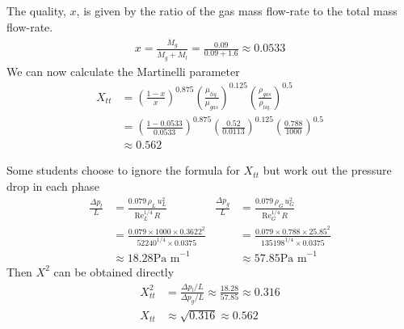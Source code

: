 \documentclass[calculator,datasheet,handbook]{exam}
\begin{document}
\begin{question}
\begin{enumerate}[a)]
\begin{enumerate}[i)]
{        The quality, $x$, is given by the ratio of the gas mass
        flow-rate to the total mass flow-rate.
        \begin{align*}
          x = \frac{\dot{M}_g}{\dot{M}_g+\dot{M}_l} = \frac{0.09}{0.09+1.6} \approx 0.0533
        \end{align*}
        We can now calculate the Martinelli parameter
        \begin{align*}
          X_{tt}&=\left(\frac{1-x}{x}\right)^{0.875}
          \left(\frac{\mu_{liq.}}{\mu_{gas}}\right)^{0.125}
          \left(\frac{\rho_{gas}}{\rho_{liq.}}\right)^{0.5}\\
          &=\left(\frac{1-0.0533}{0.0533}\right)^{0.875}
          \left(\frac{0.52}{0.0113}\right)^{0.125}
          \left(\frac{0.788}{1000}\right)^{0.5}\\
          &\approx 0.562
        \end{align*}

        
        Some students choose to ignore the formula for
        $X_{tt}$ but work out the pressure drop in each phase
        \begin{align*}
          \frac{\Delta p_l}{L} &= \frac{0.079 \,\rho_L \,u_L^2 }{\textrm{Re}_L^{1/4}\,R} & \frac{\Delta p_g}{L} &= \frac{0.079 \,\rho_G \,u_G^2 }{\textrm{Re}_G^{1/4}\,R}\\
          &= \frac{0.079\times 1000\times 0.3622^2}{52240^{1/4}\times0.0375} &
          &= \frac{0.079\times 0.788\times 25.85^2}{135198^{1/4}\times0.0375}\\
          &\approx 18.28 \textrm{Pa m}^{-1} &
          &\approx 57.85 \textrm{Pa m}^{-1}
        \end{align*}
        Then $X^2$ can be obtained directly
        \begin{align*}
          X_{tt}^2 &= \frac{\Delta p_l/L}{\Delta p_g/L} \approx \frac{18.28}{57.85} \approx 0.316\\
          X_{tt} &\approx \sqrt{0.316} \approx 0.562
        \end{align*}

}
\end{enumerate}
\end{enumerate}
\end{question}
\end{document}
